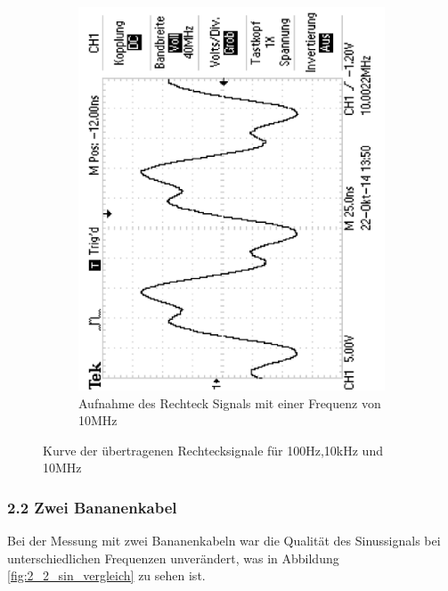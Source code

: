 \documentclass[12pt,a4paper]{article}
\begin{document}
\begin{figure}[H]
\begin{subfigure}[b]{0.28\textwidth}
                \includegraphics[width=\textwidth , scale = 0.4, angle = -90]{2_1_rech_10mhz.pdf}
                \caption[Aufnahme des Rechtecksignals mit einer Frequenz von 10MHz]{Aufnahme des Rechteck Signals mit einer Frequenz von 10MHz}
  				\label{fig:2_1_rech_10mhz}
        \end{subfigure}
        \caption{Kurve der übertragenen Rechtecksignale für 100Hz,10kHz und 10MHz}
        \label{fig:2_1_rech_vergleich}
\end{figure}



\subsubsection{2.2 Zwei Bananenkabel}


Bei der Messung mit zwei Bananenkabeln war die Qualität des Sinussignals bei unterschiedlichen Frequenzen unverändert, was in Abbildung \ref{fig:2_2_sin_vergleich} zu sehen ist.
\end{document}
